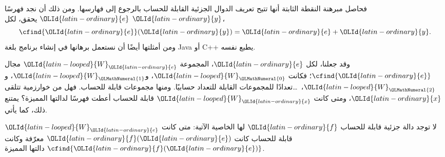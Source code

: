 \documentclass[../../../include/open-logic-section]{subfiles}
\begin{document}

فحاصل مبرهنة النقطة الثابتة أنها تتيح تعريف الدوال الجزئية القابلة
للحساب بالرجوع إلى فهارسها. ومن ذلك أن نجد فهرسًا ${\OLId{latin-ordinary}{e}}$ يحقق، لكل ${\OLId{latin-ordinary}{y}}$،
\[
\cfind{{\OLId{latin-ordinary}{e}}}({\OLId{latin-ordinary}{y}}) = {\OLId{latin-ordinary}{e}} + {\OLId{latin-ordinary}{y}}.
\]
ومن أمثلتها أيضًا أن نستعمل برهانها في إنشاء برنامج
بلغة Java أو C++ يطبع نفسه.

وقد جعلنا، لكل ${\OLId{latin-ordinary}{e}}$، المجموعة ${\OLId{latin-looped}{W}}_{\OLId{latin-ordinary}{e}}$ مجال $\cfind{{\OLId{latin-ordinary}{e}}}$؛
فكانت ${\OLId{latin-looped}{W}}_{\OLMathNumeral{0}}$، و${\OLId{latin-looped}{W}}_{\OLMathNumeral{1}}$، و${\OLId{latin-looped}{W}}_{\OLMathNumeral{2}}$،~\dots تعدادًا للمجموعات القابلة للتعداد
حسابيًا. ومنها مجموعات قابلة للحساب. فهل من خوارزمية
تتلقى ${\OLId{latin-ordinary}{x}}$، ومتى كانت ${\OLId{latin-looped}{W}}_{\OLId{latin-ordinary}{x}}$ قابلة للحساب أعطت فهرسًا
لدالتها المميزة؟ يمتنع ذلك، كما يأتي.

\begin{thm}
لا توجد دالة جزئية قابلة للحساب ${\OLId{latin-ordinary}{f}}$ لها الخاصية الآتية: متى كانت
${\OLId{latin-looped}{W}}_{\OLId{latin-ordinary}{e}}$ قابلة للحساب كانت ${\OLId{latin-ordinary}{f}}({\OLId{latin-ordinary}{e}})$ معرّفة وكانت $\cfind{{\OLId{latin-ordinary}{f}}({\OLId{latin-ordinary}{e}})}$ دالتها
المميزة.
\end{thm}
\end{document}
